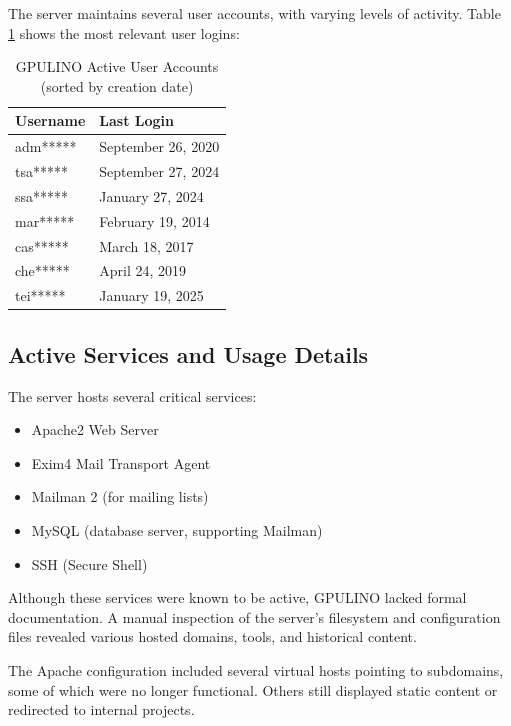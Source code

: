 The server maintains several user accounts, with varying levels of activity. Table \ref{tab:gpulino_users} shows the most relevant user logins:

\begin{table}[H]
  \centering
  \caption{GPULINO Active User Accounts (sorted by creation date)}
  \label{tab:gpulino_users}
  \begin{tabular}{ll}
    \rowcolor{udcpink!25}
    \textbf{Username} & \textbf{Last Login} \\
    \hline
    adm***** & September 26, 2020 \\
    tsa***** & September 27, 2024 \\
    ssa***** & January 27, 2024 \\
    mar***** & February 19, 2014 \\
    cas***** & March 18, 2017 \\
    che***** & April 24, 2019 \\
    tei***** & January 19, 2025 \\
  \end{tabular}
\end{table}

\subsection{Active Services and Usage Details}

The server hosts several critical services:
\begin{itemize}
    \item Apache2 Web Server
    \item Exim4 Mail Transport Agent
    \item Mailman 2 (for mailing lists)
    \item MySQL (database server, supporting Mailman)
    \item SSH (Secure Shell)
\end{itemize}

Although these services were known to be active, GPULINO lacked formal documentation. A manual inspection of the server's filesystem and configuration files revealed various hosted domains, tools, and historical content.

The Apache configuration included several virtual hosts pointing to subdomains, some of which were no longer functional. Others still displayed static content or redirected to internal projects.


